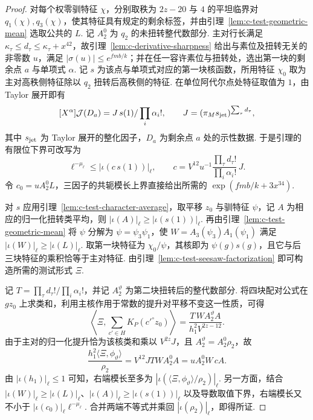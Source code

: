 \begin{proof}
对每个权零驯特征 $\chi$，分别取秩为 $2z-20$ 与 $4$ 的平坦临界对 $q_1(\chi),q_3(\chi)$，使其特征具有规定的剩余标签，并由引理~\ref{lem:c-test-geometric-mean} 选取公共的 $L$. 记 $A_2^0$ 为 $q_2$ 的未扭转整代数部分. 主对行长满足 $\kappa_\tau\le d_\tau\le\kappa_\tau+x^{42}$，故引理~\ref{lem:c-derivative-sharpness} 给出与素位及扭转无关的非零数 $u$，满足 $|\sigma(u)|\le e^{fmb/k}$；并在任一容许素位与扭转处，选出第一块的剩余点 $a$ 与单项式 $\alpha$. 记 $s$ 为该点与单项式对应的第一块核函数，所用特征 $\chi_0$ 取为主对高秩侧特征除以 $q_2$ 扭转后高秩侧的特征. 在单位阿代尔点处特征取值为 $1$，由 Taylor 展开即有
\[
 [X^\alpha]\mathcal J(D_a)=J\,s(1)/\prod_i\alpha_i!,
 \qquad J=(\pi_M s_{\rm jet})^{\sum_\tau d_\tau},
\]
其中 $s_{\rm jet}$ 为 Taylor 展开的整化因子，$D_a$ 为剩余点 $a$ 处的示性数据. 于是引理的有限位下界可改写为
\[
 \ell^{-\mu_\ell}\le |\iota(c\,s(1))|_\ell,\qquad
 c=V^{12}u^{-1}
       \frac{\prod_\tau d_\tau!}{\prod_i\alpha_i!}\,J.
\]
令 $c_0=uA_2^0 L$，三因子的共轭模长上界直接给出所需的 $\exp(fmb/k+3x^{34})$.

对 $s$ 应用引理~\ref{lem:c-test-character-average}，取平移 $z_0$ 与驯特征 $\psi$，记 $A$ 为相应的归一化扭转类平均，则 $|\iota(A)|_\ell\ge|\iota(s(1))|_\ell$. 再由引理~\ref{lem:c-test-geometric-mean} 将 $\psi$ 分解为 $\psi=\psi_3\psi_1$，使 $W=A_3(\psi_3)A_1(\psi_1)$ 满足 $|\iota(W)|_\ell\ge|\iota(L)|_\ell$. 取第一块特征为 $\chi_0/\psi$，其核即为 $\psi(g)s(g)$，且它与后三块特征的乘积恰等于主对特征. 由引理~\ref{lem:c-test-seesaw-factorization} 即可构造所需的测试形式 $\Xi$.

记 $T=\prod_\tau d_\tau!/\prod_i\alpha_i!$，并记 $A_2^\vartheta$ 为第二块扭转后的整代数部分. 将四块配对公式在 $g z_0$ 上求类和，利用主核作用于常数的提升对平移不变这一性质，可得
\[
 \left\langle\Xi,\sum_{c'\in H}K_P(c'^\circ z_0)\right\rangle
 =\frac{T\,W A_2^\vartheta A}{h_1^2V^{2z-12}}.
\]
由于主对的归一化提升恰为该核类和乘以 $V^{2z}J$，且 $A_2^\vartheta=A_2^0\rho_2$，故
\[
 \frac{h_1^2\langle\Xi,\phi_\vartheta\rangle}{\rho_2}
 =V^{12}JTWA_2^0 A=u A_2^0 W\,c A .
\]
由 $|\iota(h_1)|_\ell\le1$ 可知，右端模长至多为 $|\iota(\langle\Xi,\phi_\vartheta\rangle/\rho_2)|_\ell$. 另一方面，结合 $|\iota(W)|_\ell\ge|\iota(L)|_\ell$、$|\iota(A)|_\ell\ge|\iota(s(1))|_\ell$ 以及导数取值下界，右端模长又不小于 $|\iota(c_0)|_\ell\ell^{-\mu_\ell}$. 合并两端不等式并乘回 $|\iota(\rho_2)|_\ell$，即得所证.
\end{proof}

